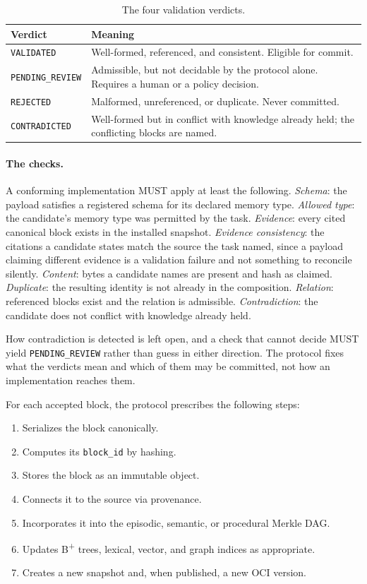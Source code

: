 \documentclass[11pt,a4paper]{article}
\begin{document}
\begin{table}[htbp]
\centering
\caption{The four validation verdicts.}
\label{tab:verdicts}
\begin{tabularx}{\textwidth}{lY}
\toprule
\textbf{Verdict} & \textbf{Meaning} \\
\midrule
\texttt{VALIDATED}       & Well-formed, referenced, and consistent. Eligible for commit. \\
\texttt{PENDING\_REVIEW} & Admissible, but not decidable by the protocol alone. Requires a human or a policy decision. \\
\texttt{REJECTED}        & Malformed, unreferenced, or duplicate. Never committed. \\
\texttt{CONTRADICTED}    & Well-formed but in conflict with knowledge already held; the conflicting blocks are named. \\
\bottomrule
\end{tabularx}
\end{table}

\paragraph{The checks.}
A conforming implementation MUST apply at least the following. \emph{Schema}:
the payload satisfies a registered schema for its declared memory type.
\emph{Allowed type}: the candidate's memory type was permitted by the task.
\emph{Evidence}: every cited canonical block exists in the installed snapshot.
\emph{Evidence consistency}: the citations a candidate states match the source
the task named, since a payload claiming different evidence is a validation
failure and not something to reconcile silently. \emph{Content}: bytes a
candidate names are present and hash as claimed. \emph{Duplicate}: the resulting
identity is not already in the composition. \emph{Relation}: referenced blocks
exist and the relation is admissible. \emph{Contradiction}: the candidate does
not conflict with knowledge already held.

How contradiction is detected is left open, and a check that cannot decide MUST
yield \texttt{PENDING\_REVIEW} rather than guess in either direction. The protocol fixes what the verdicts mean and which of them may be committed,
not how an implementation reaches them.

For each accepted block, the
protocol prescribes the following steps:

\begin{enumerate}[leftmargin=1.6em]
  \item Serializes the block canonically.
  \item Computes its \texttt{block\_id} by hashing.
  \item Stores the block as an immutable object.
  \item Connects it to the source via provenance.
  \item Incorporates it into the episodic, semantic, or procedural Merkle DAG.
  \item Updates B\textsuperscript{+} trees, lexical, vector, and graph indices
  as appropriate.
  \item Creates a new snapshot and, when published, a new OCI version.
\end{enumerate}
\end{document}
